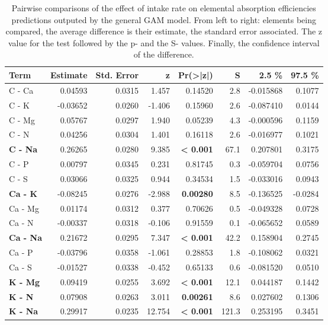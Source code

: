\begin{table}[H]
\centering
\caption{Pairwise comparisons of the effect of intake rate on elemental absorption efficiencies predictions outputed by the general GAM model. From left to right: elements being compared, the average difference is their estimate, the standard error associated. The z value for the test followed by the p- and the S- values. Finally, the confidence interval of the difference. }
\centering
\begin{tabular}[t]{>{}lrrr>{}rrrr}
\toprule
\textbf{Term} & \textbf{Estimate} & \textbf{Std. Error} & \textbf{z} & \textbf{Pr(>|z|)} & \textbf{S} & \textbf{2.5 \%} & \textbf{97.5 \%}\\
\midrule
C - Ca & 0.04593 & 0.0315 & 1.457 & 0.14520 & 2.8 & -0.015868 & 0.1077\\
C - K & -0.03652 & 0.0260 & -1.406 & 0.15960 & 2.6 & -0.087410 & 0.0144\\
C - Mg & 0.05767 & 0.0297 & 1.940 & 0.05239 & 4.3 & -0.000596 & 0.1159\\
C - N & 0.04256 & 0.0304 & 1.401 & 0.16118 & 2.6 & -0.016977 & 0.1021\\
\textbf{C - Na} & 0.26265 & 0.0280 & 9.385 & \textbf{< 0.001} & 67.1 & 0.207801 & 0.3175\\
C - P & 0.00797 & 0.0345 & 0.231 & 0.81745 & 0.3 & -0.059704 & 0.0756\\
C - S & 0.03066 & 0.0325 & 0.944 & 0.34534 & 1.5 & -0.033016 & 0.0943\\
\textbf{Ca - K} & -0.08245 & 0.0276 & -2.988 & \textbf{0.00280} & 8.5 & -0.136525 & -0.0284\\
Ca - Mg & 0.01174 & 0.0312 & 0.377 & 0.70626 & 0.5 & -0.049328 & 0.0728\\
Ca - N & -0.00337 & 0.0318 & -0.106 & 0.91559 & 0.1 & -0.065652 & 0.0589\\
\textbf{Ca - Na} & 0.21672 & 0.0295 & 7.347 & \textbf{< 0.001} & 42.2 & 0.158904 & 0.2745\\
Ca - P & -0.03796 & 0.0358 & -1.061 & 0.28853 & 1.8 & -0.108062 & 0.0321\\
Ca - S & -0.01527 & 0.0338 & -0.452 & 0.65133 & 0.6 & -0.081520 & 0.0510\\
\textbf{K - Mg} & 0.09419 & 0.0255 & 3.692 & \textbf{< 0.001} & 12.1 & 0.044187 & 0.1442\\
\textbf{K - N} & 0.07908 & 0.0263 & 3.011 & \textbf{0.00261} & 8.6 & 0.027602 & 0.1306\\
\textbf{K - Na} & 0.29917 & 0.0235 & 12.754 & \textbf{< 0.001} & 121.3 & 0.253195 & 0.3451\\

\end{tabular}
\end{table}
